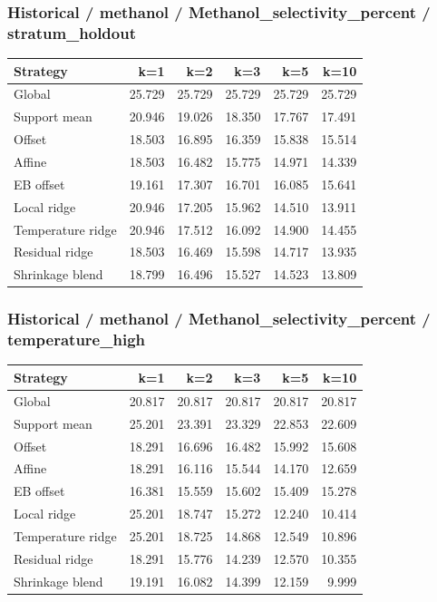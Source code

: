 \subsubsection*{Historical / methanol / Methanol\_selectivity\_percent / stratum\_holdout}
\begin{center}\small
\begin{tabular}{lrrrrr}
\toprule
Strategy & k=1 & k=2 & k=3 & k=5 & k=10 \\
\midrule
Global & 25.729 & 25.729 & 25.729 & 25.729 & 25.729 \\
Support mean & 20.946 & 19.026 & 18.350 & 17.767 & 17.491 \\
Offset & 18.503 & 16.895 & 16.359 & 15.838 & 15.514 \\
Affine & 18.503 & 16.482 & 15.775 & 14.971 & 14.339 \\
EB offset & 19.161 & 17.307 & 16.701 & 16.085 & 15.641 \\
Local ridge & 20.946 & 17.205 & 15.962 & 14.510 & 13.911 \\
Temperature ridge & 20.946 & 17.512 & 16.092 & 14.900 & 14.455 \\
Residual ridge & 18.503 & 16.469 & 15.598 & 14.717 & 13.935 \\
Shrinkage blend & 18.799 & 16.496 & 15.527 & 14.523 & 13.809 \\
\bottomrule
\end{tabular}
\end{center}

\subsubsection*{Historical / methanol / Methanol\_selectivity\_percent / temperature\_high}
\begin{center}\small
\begin{tabular}{lrrrrr}
\toprule
Strategy & k=1 & k=2 & k=3 & k=5 & k=10 \\
\midrule
Global & 20.817 & 20.817 & 20.817 & 20.817 & 20.817 \\
Support mean & 25.201 & 23.391 & 23.329 & 22.853 & 22.609 \\
Offset & 18.291 & 16.696 & 16.482 & 15.992 & 15.608 \\
Affine & 18.291 & 16.116 & 15.544 & 14.170 & 12.659 \\
EB offset & 16.381 & 15.559 & 15.602 & 15.409 & 15.278 \\
Local ridge & 25.201 & 18.747 & 15.272 & 12.240 & 10.414 \\
Temperature ridge & 25.201 & 18.725 & 14.868 & 12.549 & 10.896 \\
Residual ridge & 18.291 & 15.776 & 14.239 & 12.570 & 10.355 \\
Shrinkage blend & 19.191 & 16.082 & 14.399 & 12.159 & 9.999 \\
\bottomrule
\end{tabular}
\end{center}

